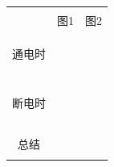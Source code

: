 \documentclass{article}
\begin{document}
\vspace{2em}

\begin{tabular}{|p{}|p{}|p{}|}
    \hline
    \multicolumn{1}{|c|}{}    &                &                \\
    \multicolumn{1}{|c|}{}    & \hspace{7em}图1 & \hspace{7em}图2 \\
    \multicolumn{1}{|c|}{}    &                &                \\
    \hline

    \multicolumn{1}{|c|}{}    &                &                \\
    \multicolumn{1}{|c|}{}    &                &                \\
    \multicolumn{1}{|c|}{通电时} &                &                \\
    \multicolumn{1}{|c|}{}    &                &                \\
    \multicolumn{1}{|c|}{}    &                &                \\
    \hline
    \multicolumn{1}{|c|}{}    &                &                \\
    \multicolumn{1}{|c|}{}    &                &                \\
    \multicolumn{1}{|c|}{}    &                &                \\
    \multicolumn{1}{|c|}{}    &                &                \\
    \multicolumn{1}{|c|}{}    &                &                \\
    \multicolumn{1}{|c|}{断电时}    &                &                \\
    \multicolumn{1}{|c|}{}    &                &                \\
    \multicolumn{1}{|c|}{}    &                &                \\
    \multicolumn{1}{|c|}{}    &                &                \\
    \multicolumn{1}{|c|}{}    &                &                \\
    \hline
    \multicolumn{1}{|c|}{}    &
    \multicolumn{2}{|c|}{}                                      \\
    \multicolumn{1}{|c|}{总结}  &
    \multicolumn{2}{|c|}{}                                      \\
    \multicolumn{1}{|c|}{}    &
    \multicolumn{2}{|c|}{}                                      \\
    \hline
\end{tabular}
\end{document}
